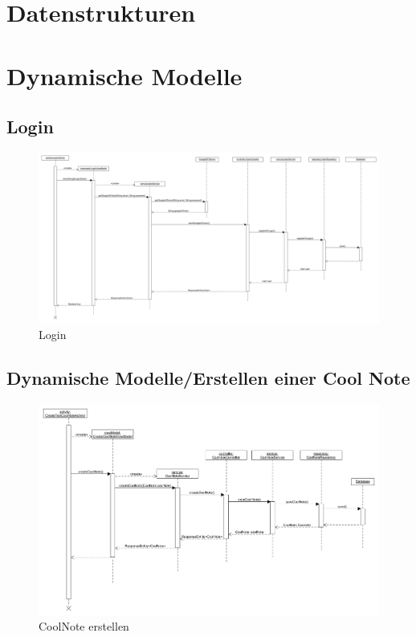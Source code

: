 \documentclass[a4paper]{scrreprt}
\begin{document}
	
 
 
\chapter{Datenstrukturen}
		

\chapter{Dynamische Modelle}
		\section{Login}
		 \begin{figure}[H]
	       \centering
	       \includegraphics[angle=90,scale = .28]{login_sequenzdiagramm.png}
	       \caption{Login}
	      \end{figure}
	      
	      	
	 
	 
		\section{Dynamische Modelle/Erstellen einer Cool Note}
		 \begin{figure}[H]
	       \centering
	       \includegraphics[scale = .35]{SD_CoolNote_erstellen.png}
	       \caption{CoolNote erstellen}
	      \end{figure}
	      
\end{document}
